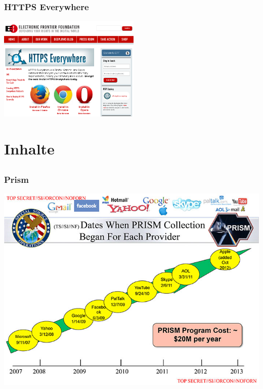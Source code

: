 \documentclass[12pt]{beamer}
\begin{document}
\begin{frame}
  \frametitle{HTTPS Everywhere}
    \begin{center}
      \includegraphics[height=5cm]{img/https-everywhere.png}
    \end{center}
\end{frame}

\section{Inhalte}
\subsection{}

\begin{frame}
    \frametitle{Prism}
    \includegraphics[height=0.7\textheight]{img/prism.jpg}
\end{frame}
\end{document}
